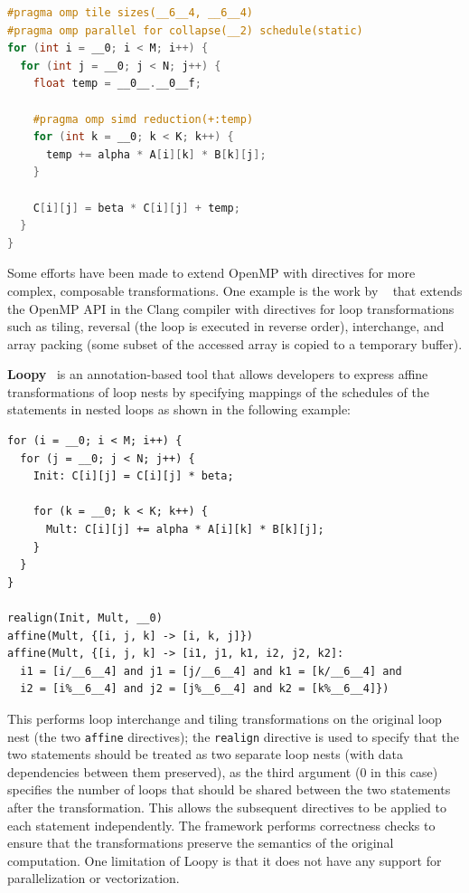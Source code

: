 \begin{lstlisting}[language=C++]
#pragma omp tile sizes(__6__4, __6__4)
#pragma omp parallel for collapse(__2) schedule(static)
for (int i = __0; i < M; i++) {
  for (int j = __0; j < N; j++) {
    float temp = __0__.__0__f;

    #pragma omp simd reduction(+:temp)
    for (int k = __0; k < K; k++) {
      temp += alpha * A[i][k] * B[k][j];
    }

    C[i][j] = beta * C[i][j] + temp;
  }
}
\end{lstlisting}

Some efforts have been made to extend OpenMP with directives for more complex, composable transformations. One example is the work by \citeauthor{kruse2018user}~\cite{kruse2018user} that extends the OpenMP API in the Clang compiler with directives for loop transformations such as tiling, reversal (the loop is executed in reverse order), interchange, and array packing (some subset of the accessed array is copied to a temporary buffer).

\textbf{Loopy}~\cite{namjoshi2016loopy} is an annotation-based tool that allows developers to express affine transformations of loop nests by specifying mappings of the schedules of the statements in nested loops as shown in the following example:

\begin{lstlisting}
for (i = __0; i < M; i++) {
  for (j = __0; j < N; j++) {
    Init: C[i][j] = C[i][j] * beta;

    for (k = __0; k < K; k++) {
      Mult: C[i][j] += alpha * A[i][k] * B[k][j];
    }
  }
}

realign(Init, Mult, __0)
affine(Mult, {[i, j, k] -> [i, k, j]})
affine(Mult, {[i, j, k] -> [i1, j1, k1, i2, j2, k2]:
  i1 = [i/__6__4] and j1 = [j/__6__4] and k1 = [k/__6__4] and
  i2 = [i%__6__4] and j2 = [j%__6__4] and k2 = [k%__6__4]})
\end{lstlisting}

This performs loop interchange and tiling transformations on the original loop nest (the two \lstinline{affine} directives); the \lstinline{realign} directive is used to specify that the two statements should be treated as two separate loop nests (with data dependencies between them preserved), as the third argument ($0$ in this case) specifies the number of loops that should be shared between the two statements after the transformation. This allows the subsequent directives to be applied to each statement independently. The framework performs correctness checks to ensure that the transformations preserve the semantics of the original computation. One limitation of Loopy is that it does not have any support for parallelization or vectorization.


